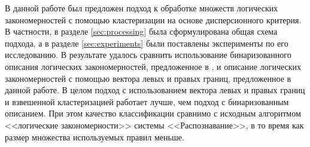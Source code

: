 \documentclass[12pt]{article}
\begin{document}




В данной работе был предложен подход к обработке множеств логических
закономерностей с помощью кластеризации на основе дисперсионного
критерия. В частности, в разделе \ref{sec:processing} была
сформулирована общая схема подхода, а в разделе \ref{sec:experiments}
были поставлены эксперименты по его исследованию. В результате удалось
сравнить использование бинаризованного описания логических
закономерностей, предложенное в \cite{novikov15}, и описание
логических закономерностей с помощью вектора левых и правых границ,
предложенное в данной работе.  В целом подход с использованием вектора
левых и правых границ и взвешенной кластеризацией работает лучше, чем
подход с бинаризованным описанием. При этом качество классификации
сравнимо с исходным алгоритмом <<логические закономерности>> системы
<<Распознавание>>, в то время как размер множества используемых правил
меньше.

\newpage
\end{document}
